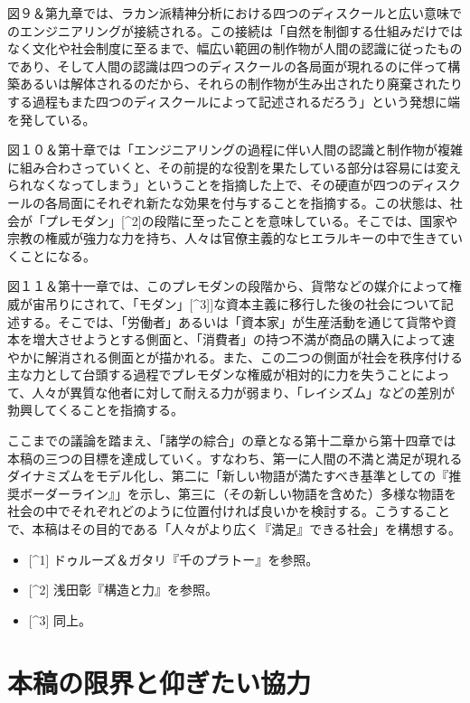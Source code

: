 \documentclass[8pt, a5paper]{ltjsarticle}
\providecommand{\tightlist}{%
  \setlength{\itemsep}{0pt}\setlength{\parskip}{0pt}}
\begin{document}
図９＆第九章では、ラカン派精神分析における四つのディスクールと広い意味でのエンジニアリングが接続される。この接続は「自然を制御する仕組みだけではなく文化や社会制度に至るまで、幅広い範囲の制作物が人間の認識に従ったものであり、そして人間の認識は四つのディスクールの各局面が現れるのに伴って構築あるいは解体されるのだから、それらの制作物が生み出されたり廃棄されたりする過程もまた四つのディスクールによって記述されるだろう」という発想に端を発している。

図１０＆第十章では「エンジニアリングの過程に伴い人間の認識と制作物が複雑に組み合わさっていくと、その前提的な役割を果たしている部分は容易には変えられなくなってしまう」ということを指摘した上で、その硬直が四つのディスクールの各局面にそれぞれ新たな効果を付与することを指摘する。この状態は、社会が「プレモダン」{[}\^{}2{]}の段階に至ったことを意味している。そこでは、国家や宗教の権威が強力な力を持ち、人々は官僚主義的なヒエラルキーの中で生きていくことになる。

図１１＆第十一章では、このプレモダンの段階から、貨幣などの媒介によって権威が宙吊りにされて、「モダン」{[}\^{}3{]}{]}な資本主義に移行した後の社会について記述する。そこでは、「労働者」あるいは「資本家」が生産活動を通じて貨幣や資本を増大させようとする側面と、「消費者」の持つ不満が商品の購入によって速やかに解消される側面とが描かれる。また、この二つの側面が社会を秩序付ける主な力として台頭する過程でプレモダンな権威が相対的に力を失うことによって、人々が異質な他者に対して耐える力が弱まり、「レイシズム」などの差別が勃興してくることを指摘する。

ここまでの議論を踏まえ、「諸学の綜合」の章となる第十二章から第十四章では本稿の三つの目標を達成していく。すなわち、第一に人間の不満と満足が現れるダイナミズムをモデル化し、第二に「新しい物語が満たすべき基準としての『推奨ボーダーライン』」を示し、第三に（その新しい物語を含めた）多様な物語を社会の中でそれぞれどのように位置付ければ良いかを検討する。こうすることで、本稿はその目的である「人々がより広く『満足』できる社会」を構想する。

\begin{itemize}
\tightlist
\item
  {[}\^{}1{]} ドゥルーズ＆ガタリ『千のプラトー』を参照。
\item
  {[}\^{}2{]} 浅田彰『構造と力』を参照。
\item
  {[}\^{}3{]} 同上。
\end{itemize}

\section{本稿の限界と仰ぎたい協力}\label{ux672cux7a3fux306eux9650ux754cux3068ux4ef0ux304eux305fux3044ux5354ux529b}
\end{document}
